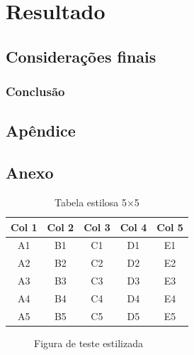 \documentclass{Arquivos/AcademicoPadrao}
\begin{document}
\part{Resultado} %
\chapter{Considerações finais}
\section{Conclusão}


\postextual %


\printbibliography[heading=none]


\inicioApendices
\chapter{Apêndice}


\inicioAnexos
\chapter{Anexo}

\begin{table}[ht]
    \centering
    \caption{Tabela estilosa 5×5}
    \label{tab:estilosa}
    \begin{tabular}{ccccc}
        \toprule
        Col 1 & Col 2 & Col 3 & Col 4 & Col 5 \\
        \midrule
        A1 & B1 & C1 & D1 & E1 \\
        A2 & B2 & C2 & D2 & E2 \\
        A3 & B3 & C3 & D3 & E3 \\
        A4 & B4 & C4 & D4 & E4 \\
        A5 & B5 & C5 & D5 & E5 \\
        \bottomrule
    \end{tabular}
\end{table}

\begin{figure}[ht]
    \centering
    \caption{Figura de teste estilizada}
    \label{fig:teste-estilosa}
\end{figure}
\end{document}
